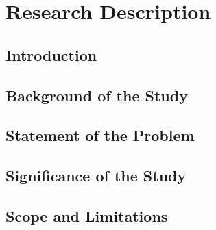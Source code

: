\chapter{Research Description}
\label{sec:researchdesc} 

\section{Introduction}
\label{sec:introduction}

\section{Background of the Study}
\label{sec:backgroundstudy}

\section{Statement of the Problem}
\label{sec:statementprob}

\section{Significance of the Study}
\label{sec:significancestudy}

\section{Scope and Limitations}
\label{sec:significance}
